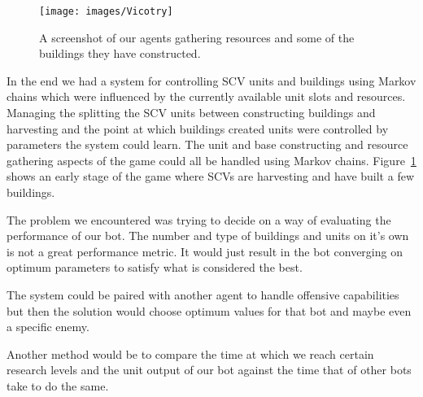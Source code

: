 
\begin{figure}[ht]
\centering
\texttt{[image: images/Vicotry]}
\label{fig:gameplay}
\caption{A screenshot of our agents gathering resources and some of the buildings they have constructed.}
\end{figure}


In the end we had a system for controlling SCV units and buildings using Markov chains which were influenced by the currently available unit slots and resources. Managing the splitting the SCV units between constructing buildings and harvesting and the point at which buildings created units were controlled by parameters the system could learn. The unit and base constructing and resource gathering aspects of the game could all be handled using Markov chains. Figure~\ref{fig:gameplay} shows an early stage of the game where SCVs are harvesting and have built a few buildings.


 The problem we encountered was trying to decide on a way of evaluating the performance of our bot. The number and type of buildings and units on it's own is not a great performance metric. It would just result in the bot converging on optimum parameters to satisfy what is considered the best.

 The system could be paired with another agent to handle offensive capabilities but then the solution would choose optimum values for that bot and maybe even a specific enemy.

 Another method would be to compare the time at which we reach certain research levels and the unit output of our bot against the time that of other bots take to do the same.